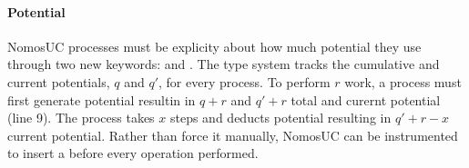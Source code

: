 \paragraph{Potential}
NomosUC processes must be explicity about how much potential they use through two new keywords: \inline{$\ngenpot$} and \inline{$\ntick$}.
The type system tracks the cumulative and current potentials, $q$ and $q'$, for every process.
To perform $r$ work, a process must first generate  potential resultin in $q+r$ and $q'+r$ total and curernt potential (line 9).
The process takes $x$ steps and deducts  potential resulting in $q'+r-x$ current potential.
Rather than force it manually, NomosUC can be instrumented to insert a \tick before every operation performed.

